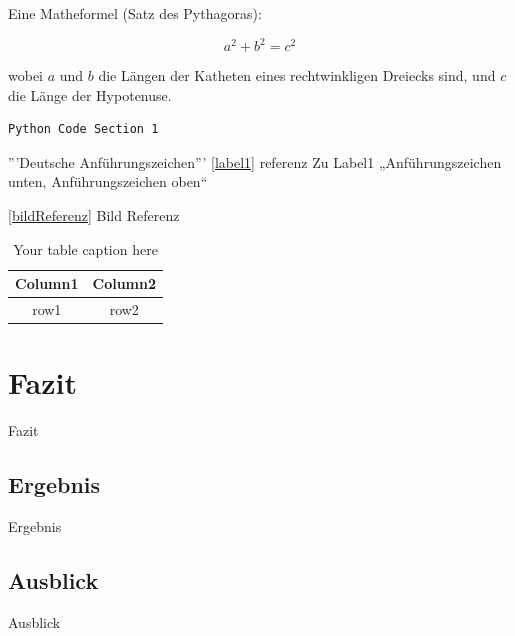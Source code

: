 Eine Matheformel (Satz des Pythagoras):

\[
a^2 + b^2 = c^2
\]

wobei \(a\) und \(b\) die Längen der Katheten eines rechtwinkligen Dreiecks sind, und \(c\) die Länge der Hypotenuse.



\begin{lstlisting}[caption={Pip Update}, label={lst:upgradePip}]
    Python Code Section 1
\end{lstlisting}


'''Deutsche Anführungszeichen''' \ref{label1} referenz Zu Label1 
„Anführungszeichen unten, Anführungszeichen oben“

\ref{bildReferenz} Bild Referenz

\begin{table}[h]
    \centering
    \begin{tabular}{|c|c|}
    \hline
        \textbf{Column1} & \textbf{Column2} \\ \hline
        row1 & row2 \\ \hline
    \end{tabular}
    \caption{Your table caption here}
    \label{table:1}
\end{table}

\newpage
\section{Fazit}
Fazit
\subsection{Ergebnis}
Ergebnis

\subsection{Ausblick}
Ausblick

\newpage
